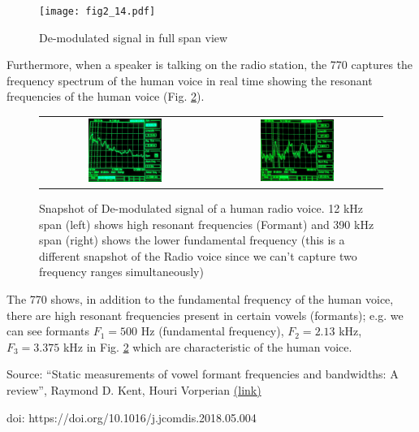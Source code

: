\documentclass[../main.tex]{subfiles}
\begin{document}
\begin{itemize}
\begin{figure}[ht]
        \begin{minipage}{0.45\textwidth}
            \centering
            \texttt{[image: fig2\_14.pdf]}
            \caption{De-modulated signal in full span view}
            \label{fig:2.14b}
        \end{minipage}
    \end{figure}
    Furthermore, when a speaker is talking on the radio station, the 770 captures the frequency spectrum of the human voice in real time showing the resonant frequencies of the human voice (Fig. \ref{fig:2.15}).
    \begin{figure}[ht]
        \centering
        \begin{tabular}{cc}
            \includegraphics[width=0.45\textwidth]{fig2_15.pdf} & \includegraphics[width=0.45\textwidth]{fig2_16.pdf}
        \end{tabular}
        \captionsetup{width=0.8\textwidth}
        \caption{Snapshot of De-modulated signal of a human radio voice. 12 kHz span (left) shows high resonant frequencies (Formant) and 390 kHz span (right) shows the lower fundamental frequency (this is a different snapshot of the Radio voice since we can't capture two frequency ranges simultaneously) }
        \label{fig:2.15}
    \end{figure}

    \newpage
    The 770 shows, in addition to the fundamental frequency of the human voice, there are high resonant frequencies present in certain vowels (formants);
    e.g. we can see formants $F_1 = 500$ Hz (fundamental frequency), $F_2 = 2.13$ kHz, $F_3 = 3.375$ kHz in Fig. \ref{fig:2.15} which are characteristic of the human voice.

    Source: ``Static measurements of vowel formant frequencies and bandwidths: A review'', Raymond D. Kent, Houri Vorperian \href{https://www.sciencedirect.com/science/article/pii/S0021992417302575}{(link)}
    
    doi: https://doi.org/10.1016/j.jcomdis.2018.05.004
\end{itemize}
\end{document}
